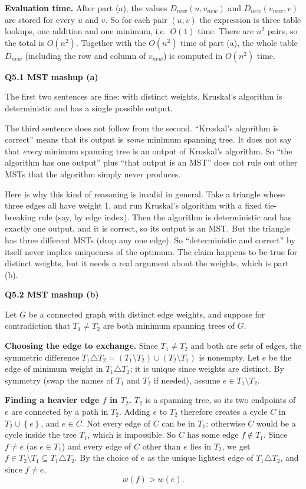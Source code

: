 \documentclass[11pt]{article}
\newcommand{\set}[1]{\left\{#1\right\}}
\newcommand{\qpage}[1]{\clearpage\noindent\textbf{\large #1}\par\medskip}
\begin{document}
\textbf{Evaluation time.}
After part (a), the values $D_{new}(u,v_{new})$ and $D_{new}(v_{new},v)$ are stored for every $u$ and $v$.
So for each pair $(u,v)$ the expression is three table lookups, one addition and one minimum, i.e.\ $O(1)$ time.
There are $n^2$ pairs, so the total is $O(n^2)$.
Together with the $O(n^2)$ time of part (a), the whole table $D_{new}$ (including the row and column of $v_{new}$) is computed in $O(n^2)$ time.
    

\qpage{Q5.1 MST mashup (a)}

The first two sentences are fine: with distinct weights, Kruskal's algorithm is deterministic and has a single possible output.

The third sentence does not follow from the second.
``Kruskal's algorithm is correct'' means that its output is \emph{some} minimum spanning tree.
It does not say that \emph{every} minimum spanning tree is an output of Kruskal's algorithm.
So ``the algorithm has one output'' plus ``that output is an MST'' does not rule out other MSTs that the algorithm simply never produces.

Here is why this kind of reasoning is invalid in general.
Take a triangle whose three edges all have weight 1, and run Kruskal's algorithm with a fixed tie-breaking rule (say, by edge index).
Then the algorithm is deterministic and has exactly one output, and it is correct, so its output is an MST.
But the triangle has three different MSTs (drop any one edge).
So ``deterministic and correct'' by itself never implies uniqueness of the optimum.
The claim happens to be true for distinct weights, but it needs a real argument about the weights, which is part (b).
    

\qpage{Q5.2 MST mashup (b)}

Let $G$ be a connected graph with distinct edge weights, and suppose for contradiction that $T_1 \ne T_2$ are both minimum spanning trees of $G$.

\textbf{Choosing the edge to exchange.}
Since $T_1 \ne T_2$ and both are sets of edges, the symmetric difference $T_1 \triangle T_2 = (T_1 \setminus T_2) \cup (T_2 \setminus T_1)$ is nonempty.
Let $e$ be the edge of minimum weight in $T_1 \triangle T_2$; it is unique since weights are distinct.
By symmetry (swap the names of $T_1$ and $T_2$ if needed), assume $e \in T_1 \setminus T_2$.

\textbf{Finding a heavier edge $f$ in $T_2$.}
$T_2$ is a spanning tree, so its two endpoints of $e$ are connected by a path in $T_2$.
Adding $e$ to $T_2$ therefore creates a cycle $C$ in $T_2 \cup \set{e}$, and $e \in C$.
Not every edge of $C$ can be in $T_1$: otherwise $C$ would be a cycle inside the tree $T_1$, which is impossible.
So $C$ has some edge $f \notin T_1$.
Since $f \ne e$ (as $e \in T_1$) and every edge of $C$ other than $e$ lies in $T_2$, we get $f \in T_2 \setminus T_1 \subseteq T_1 \triangle T_2$.
By the choice of $e$ as the unique lightest edge of $T_1 \triangle T_2$, and since $f \ne e$,
\[
  w(f) > w(e).
\]
\end{document}
